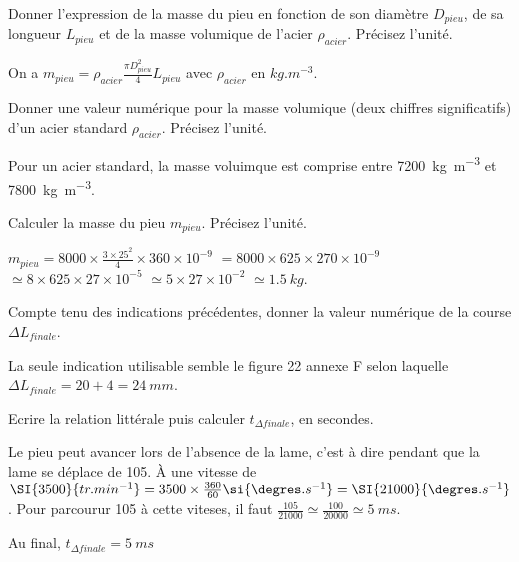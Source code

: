 \documentclass[11pt]{article}
\begin{document}
\UPSTIquestion* Donner l'expression de la masse du pieu en fonction de son diamètre $D_{pieu}$, de sa longueur $L_{pieu}$ et de la masse volumique de l'acier $\rho_{acier}$. Précisez l'unité. 

\begin{UPSTIcorrige}
On a  $m_{pieu} = \rho_{acier} \frac{\pi D^2_{pieu}}{4} L_{pieu}$ avec $\rho_{acier}$ en $\si{kg.m^{-3}}$. 
\end{UPSTIcorrige}

\UPSTIquestion Donner une valeur numérique pour la masse volumique (deux chiffres significatifs) d'un acier standard $\rho_{acier}$. Précisez l'unité. 

\begin{UPSTIcorrige}
Pour un acier standard, la masse voluimque est comprise entre \SI{7200}{kg.m^{-3}} et \SI{7800}{kg.m^{-3}}.
\end{UPSTIcorrige}

\UPSTIquestion Calculer la masse du pieu $m_{pieu}$. Précisez l'unité. 

\begin{UPSTIcorrige}
$m_{pieu} = 8000 \times \frac{3\times 25^2}{4} \times 360 \times 10^{-9}$
$= 8000 \times 625\times 270 \times 10^{-9}$
$\simeq 8 \times625\times 27 \times 10^{-5}$
$\simeq 5\times 27 \times 10^{-2}$
$\simeq \SI{1,5}{kg}$.


\end{UPSTIcorrige}


\UPSTIquestion Compte tenu des indications précédentes, donner la valeur numérique de la course $\Delta L_{finale}$. 

\begin{UPSTIcorrige}

La seule indication utilisable semble le figure 22 annexe F selon laquelle  $\Delta L_{finale} = 20 + 4 = \SI{24}{mm}$.

\end{UPSTIcorrige}

\UPSTIquestion Ecrire la relation littérale puis calculer $t_{\Delta finale}$, en secondes.
\begin{UPSTIcorrige}
Le pieu peut avancer lors de l'absence de la lame, c'est à dire pendant que la lame se déplace de \SI{105}{\degres}. 
À une vitesse de $\SI{3500}{tr.min^{-1}} = 3500\times \frac{360}{60} \si{\degres.s^{-1}} =   \SI{21000}{\degres.s^{-1}}$. Pour parcourur \SI{105}{\degres} à cette viteses, il faut $\frac{105}{21000} \simeq \frac{100}{20000} \simeq \SI{5}{ms}$. 

Au final, $t_{\Delta finale} = \SI{5}{ms} $
\end{UPSTIcorrige}
\end{document}
